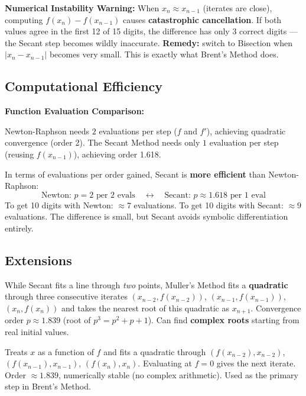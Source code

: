 \documentclass[12pt]{article}
\begin{document}
\begin{keybox}
\textbf{Numerical Instability Warning:} When $x_n\approx x_{n-1}$ (iterates are close), computing $f(x_n)-f(x_{n-1})$ causes \textbf{catastrophic cancellation}. If both values agree in the first 12 of 15 digits, the difference has only 3 correct digits — the Secant step becomes wildly inaccurate. \textbf{Remedy:} switch to Bisection when $|x_n-x_{n-1}|$ becomes very small. This is exactly what Brent's Method does.
\end{keybox}

\bigskip

\subsection*{Computational Efficiency}

\begin{keybox}
\textbf{Function Evaluation Comparison:}

Newton-Raphson needs $2$ evaluations per step ($f$ and $f'$), achieving quadratic convergence (order 2). The Secant Method needs only $1$ evaluation per step (reusing $f(x_{n-1})$), achieving order 1.618.

\medskip
In terms of evaluations per order gained, Secant is \textbf{more efficient} than Newton-Raphson:
\[
  \text{Newton: } p = 2 \text{ per 2 evals} \quad\leftrightarrow\quad
  \text{Secant: } p \approx 1.618 \text{ per 1 eval}
\]
To get 10 digits with Newton: $\approx 7$ evaluations. To get 10 digits with Secant: $\approx 9$ evaluations. The difference is small, but Secant avoids symbolic differentiation entirely.
\end{keybox}

\bigskip

\subsection*{Extensions}

\begin{defbox}
While Secant fits a line through \textit{two} points, Muller's Method fits a \textbf{quadratic} through three consecutive iterates $(x_{n-2},f(x_{n-2}))$, $(x_{n-1},f(x_{n-1}))$, $(x_n,f(x_n))$ and takes the nearest root of this quadratic as $x_{n+1}$. Convergence order $p\approx 1.839$ (root of $p^3=p^2+p+1$). Can find \textbf{complex roots} starting from real initial values.
\end{defbox}

\begin{defbox}
Treats $x$ as a function of $f$ and fits a quadratic through $(f(x_{n-2}),x_{n-2})$, $(f(x_{n-1}),x_{n-1})$, $(f(x_n),x_n)$. Evaluating at $f=0$ gives the next iterate. Order $\approx 1.839$, numerically stable (no complex arithmetic). Used as the primary step in Brent's Method.
\end{defbox}
\end{document}
